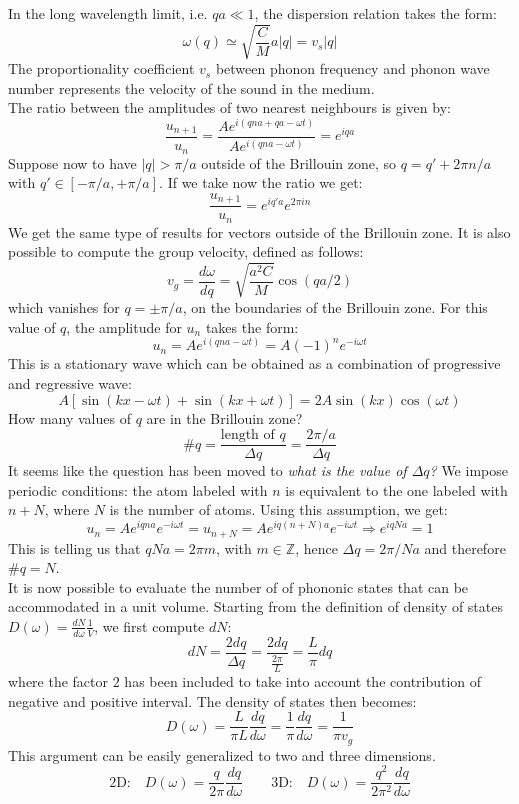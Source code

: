 \documentclass[10.75pt,a4paper,openright,bottom=2cm]{article}
\begin{document}
In the long wavelength limit, i.e. $qa\ll1$, the dispersion relation takes the form:
\[
\omega(q)\simeq\sqrt{\frac{C}{M}}a|q|=v_s|q| 
\]
The proportionality coefficient $v_s$ between phonon frequency and phonon wave number represents the velocity of the sound in the medium.\\
The ratio between the amplitudes of two nearest neighbours is given by:
\[
\frac{u_{n+1}}{u_n}=\frac{Ae^{i(qna+qa-\omega t)}}{Ae^{i(qna-\omega t)}}=e^{iqa}
\]
Suppose now to have $|q|>\pi/a$ outside of the  Brillouin zone, so $q=q'+2\pi n/a$ with $q'\in[-\pi/a,+\pi/a]$. If we take now the ratio we get:
\[
\frac{u_{n+1}}{u_n}=e^{iq'a}e^{2\pi in}
\]
We get the same type of results for vectors outside of the  Brillouin zone. It is also possible to compute the group velocity, defined as follows:
\[
v_g=\frac{d\omega}{dq}=\sqrt{\frac{a^2C}{M}}\cos(qa/2)
\]
which vanishes for $q=\pm\pi/a$, on the boundaries of the  Brillouin zone. For this value of $q$, the amplitude for $u_n$ takes the form:
\[
u_n=Ae^{i(qna-\omega t)}=A(-1)^ne^{-i\omega t}
\]
This is a stationary wave which can be obtained as a combination of progressive and regressive wave:
\[
A[\sin(kx-\omega t)+\sin(kx+\omega t)]=2A\sin(kx)\cos(\omega t)
\]
How many values of $q$ are in the  Brillouin zone?
\[
\#q=\frac{\text{length of $q$}}{\Delta q}=\frac{2\pi/a}{\Delta q}
\]
It seems like the question has been moved to \textit{what is the value of $\Delta q$?} We impose periodic conditions: the atom labeled with $n$ is equivalent to the one labeled with $n+N$, where $N$ is the number of atoms. Using this assumption, we get:
\[
u_n=Ae^{iqna}e^{-i\omega t}=u_{n+N}=Ae^{iq(n+N)a}e^{-i\omega t}\Rightarrow e^{iqNa}=1
\]
This is telling us that $qNa=2\pi m$, with $m\in\mathbb{Z}$, hence $\Delta q=2\pi/Na$ and therefore $\#q=N$.\\
It is now possible to evaluate the number of of phononic states that can be accommodated in a unit volume. Starting from the definition of density of states $D(\omega)=\frac{dN}{d\omega}\frac{1}{V}$, we first compute $dN$:
\[
dN=\frac{2dq}{\Delta q}=\frac{2dq}{\frac{2\pi}{L}}=\frac{L}{\pi}dq
\]
where the factor $2$ has been included to take into account the contribution of negative and positive interval. The density of states then becomes:
\[
D(\omega)=\frac{L}{\pi L}\frac{dq}{d\omega}=\frac{1}{\pi}\frac{dq}{d\omega}=\frac{1}{\pi v_g}
\]
This argument can be easily generalized to two and three dimensions.
\[
\text{2D:}\quad D(\omega)=\frac{q}{2\pi}\frac{dq}{d\omega} \qquad \text{3D:}\quad D(\omega)=\frac{q^2}{2\pi^2}\frac{dq}{d\omega}
\]
\end{document}
